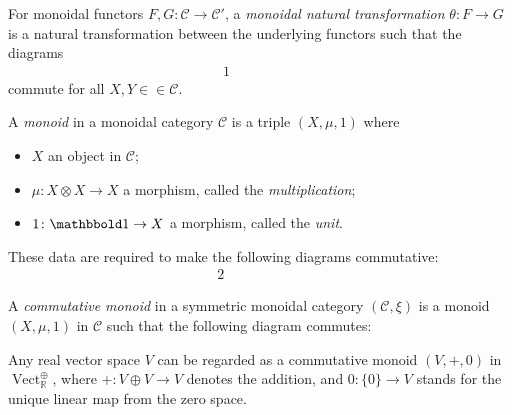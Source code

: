 \documentclass[10pt]{simplearticle}
\newcommand{\tikzinput}[1]{}
\newcommand{\tensorunit}{\mathbbold1}
\newcommand{\Vect}{\operatorname{Vect}}
\begin{document}
\begin{defn}\label{def:mon-nt}
 For monoidal functors $F,G\colon\mathcal{C}\to\mathcal{C}'$,
a \emph{monoidal natural transformation} $\theta\colon F\to G$ is
a natural transformation between the underlying functors such that
the diagrams
\begin{alignat}{1}
\tikzinput{d330}\qquad\qquad & \tikzinput{d331}\label{eq:mon-nt}
\end{alignat}
commute for all $X,Y\in\in\mathcal{C}$.
\end{defn}

\begin{defn}
A \emph{monoid} in a monoidal category $\mathcal{C}$ is a triple
$(X,\mu,1)$ where
\begin{itemize}
\item $X$ an object in $\mathcal{C}$;
\item $\mu\colon X\otimes X\to X$ a morphism, called the \emph{multiplication};
\item $1\colon\tensorunit\to X$ a morphism, called the \emph{unit}.
\end{itemize}
These data are required to make the following diagrams commutative:
\begin{alignat*}{2}
\tikzinput{d332} & \qquad\qquad & \tikzinput{d333}
\end{alignat*}

\end{defn}

\begin{defn}
A \emph{commutative monoid} in a symmetric monoidal category $(\mathcal{C},\xi)$
is a monoid $(X,\mu,1)$ in $\mathcal{C}$ such that the following
diagram commutes:
\[
\tikzinput{d334}
\]
\end{defn}

\begin{example}
Any real vector space $V$ can be regarded as a commutative monoid
$(V,+,0)$ in $\Vect^{\oplus}_{\mathbb{R}}$, where $+\colon V\oplus V\to V$
denotes the addition, and $0\colon\{0\}\to V$ stands for the unique
linear map from the zero space.
\end{example}
\end{document}
